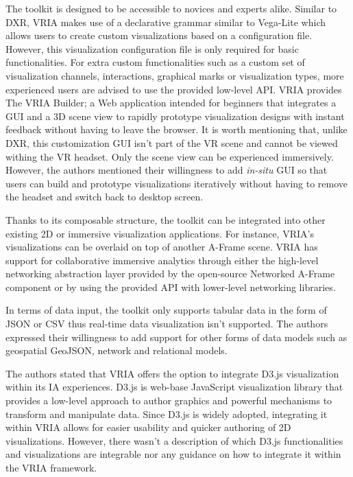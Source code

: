 \documentclass{vgtc}                          %
\begin{document}
\noindent The toolkit is designed to be accessible to novices and experts
alike. Similar to DXR, VRIA makes use of a declarative grammar similar to
Vega-Lite \cite{vega_lite} which allows users to create custom visualizations based on a configuration
file. However, this visualization configuration file is only required for
basic functionalities. For extra custom functionalities such as a custom set of
visualization channels, interactions, graphical marks or visualization types,
more experienced users are advised to use the provided low-level API.
VRIA provides The VRIA Builder; a Web application intended for beginners that
integrates a GUI and a 3D scene view to rapidly prototype visualization designs
with instant feedback without having to leave the browser. It is worth
mentioning that, unlike DXR, this customization GUI isn't part of the VR scene
and cannot be viewed withing the VR headset. Only the scene view can be
experienced immersively. However, the authors mentioned their willingness to
add \textit{in-situ} GUI so that users can build and prototype visualizations
iteratively without having to remove the headset and switch back to desktop
screen.

\smallskip

\noindent Thanks to its composable structure, the toolkit can be integrated into
other existing 2D or immersive visualization applications. For instance,
VRIA's visualizations can be overlaid on top of another A-Frame scene.
VRIA has support for collaborative immersive analytics through either the
high-level networking abstraction layer provided by the open-source Networked
A-Frame component or by using the provided API with lower-level networking
libraries.

\smallskip

\noindent In terms of data input, the toolkit only supports tabular data in the form of
JSON or CSV thus real-time data visualization isn't supported. The authors
expressed their willingness to add support for other forms of data models such as
geospatial GeoJSON, network and relational models.

\smallskip

\noindent The authors stated that VRIA offers the option to integrate D3.js
visualization within its IA experiences. D3.js is web-base JavaScript
visualization library that provides a low-level approach to author graphics and
powerful mechanisms to transform and manipulate data. Since D3.js is widely
adopted, integrating it within VRIA allows for easier usability and quicker
authoring of 2D visualizations. However, there wasn't a description of
which D3.js functionalities and visualizations are integrable nor any guidance
on how to integrate it within the VRIA framework.
\end{document}
